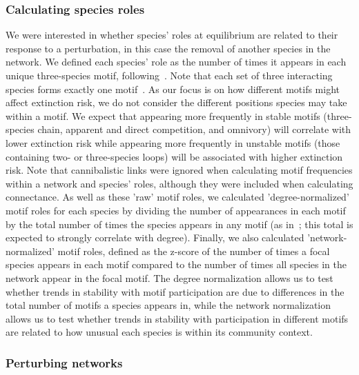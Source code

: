 \documentclass[12pt]{article}
\begin{document}
    
    	\subsubsection*{Calculating species roles}
    
    
    		We were interested in whether species' roles at equilibrium are related to their response to a perturbation, in this case the removal of another species in the network. We defined each species' role as the number of times it appears in each unique three-species motif, following~\citet{Stouffer2012,Cirtwill2015}. Note that each set of three interacting species forms exactly one motif~\citep{Cirtwill2018FoodWebs}. As our focus is on how different motifs might affect extinction risk, we do not consider the different positions species may take within a motif. We expect that appearing more frequently in stable motifs (three-species chain, apparent and direct competition, and omnivory) will correlate with lower extinction risk while appearing more frequently in unstable motifs (those containing two- or three-species loops) will be associated with higher extinction risk.	Note that cannibalistic links were ignored when calculating motif frequencies within a network and species' roles, although they were included when calculating connectance. As well as these 'raw' motif roles, we calculated 'degree-normalized' motif roles for each species by dividing the number of appearances in each motif by the total number of times the species appears in any motif (as in~\citet{Cirtwill2015}; this total is expected to strongly correlate with degree). Finally, we also calculated 'network-normalized' motif roles, defined as the z-score of the number of times a focal species appears in each motif compared to the number of times all species in the network appear in the focal motif.
    		The degree normalization allows us to test whether trends in stability with motif participation are due to differences in the total number of motifs a species appears in, while the network normalization allows us to test whether trends in stability with participation in different motifs are related to how unusual each species is within its community context.
    
    
    	\subsubsection*{Perturbing networks}
    
\end{document}
